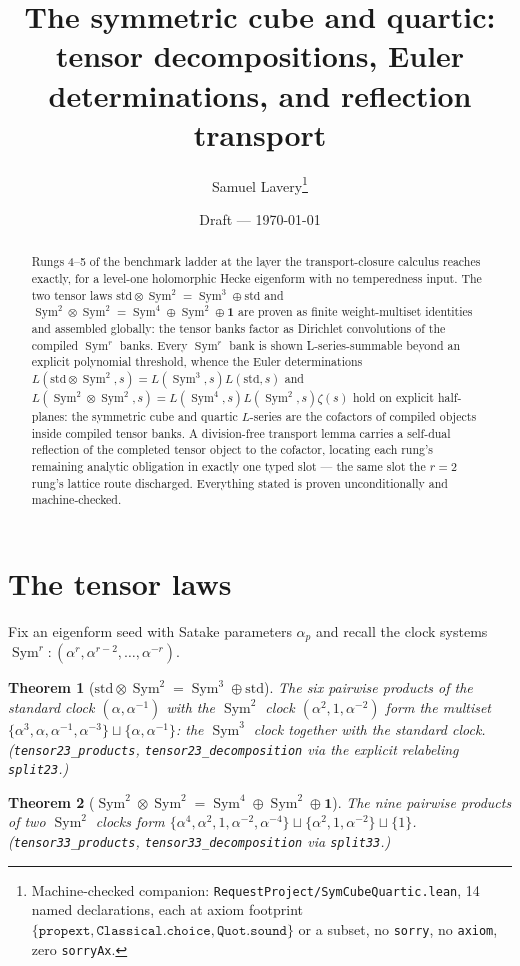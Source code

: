 \documentclass[11pt]{article}
\title{The symmetric cube and quartic:\\ tensor decompositions, Euler determinations,
and reflection transport}
\author{Samuel Lavery\thanks{Machine-checked companion:
\texttt{RequestProject/SymCubeQuartic.lean}, 14 named declarations, each at axiom
footprint $\{\texttt{propext},\texttt{Classical.choice},\texttt{Quot.sound}\}$ or a
subset, no \texttt{sorry}, no \texttt{axiom}, zero \texttt{sorryAx}.}}
\date{Draft --- \today}
\newtheorem{theorem}{Theorem}
\newcommand{\Sym}{\operatorname{Sym}}
\begin{document}
\maketitle

\begin{abstract}
Rungs 4--5 of the benchmark ladder at the layer the transport-closure calculus reaches
exactly, for a level-one holomorphic Hecke eigenform with no temperedness input.  The two
tensor laws $\mathrm{std}\otimes\Sym^2=\Sym^3\oplus\mathrm{std}$ and
$\Sym^2\otimes\Sym^2=\Sym^4\oplus\Sym^2\oplus\mathbf 1$ are proven as finite
weight-multiset identities and assembled globally: the tensor banks factor as Dirichlet
convolutions of the compiled $\Sym^r$ banks.  Every $\Sym^r$ bank is shown
L-series-summable beyond an explicit polynomial threshold, whence the Euler
determinations $L(\mathrm{std}\otimes\Sym^2,s)=L(\Sym^3,s)L(\mathrm{std},s)$ and
$L(\Sym^2\otimes\Sym^2,s)=L(\Sym^4,s)L(\Sym^2,s)\zeta(s)$ hold on explicit half-planes:
the symmetric cube and quartic $L$-series are the cofactors of compiled objects inside
compiled tensor banks.  A division-free transport lemma carries a self-dual reflection of
the completed tensor object to the cofactor, locating each rung's remaining analytic
obligation in exactly one typed slot --- the same slot the $r=2$ rung's lattice route
discharged.  Everything stated is proven unconditionally and machine-checked.
\end{abstract}

\section{The tensor laws}

Fix an eigenform seed with Satake parameters $\alpha_p$ and recall the clock systems
$\Sym^r\!: (\alpha^{r},\alpha^{r-2},\dots,\alpha^{-r})$.

\begin{theorem}[$\mathrm{std}\otimes\Sym^2=\Sym^3\oplus\mathrm{std}$]\label{thm:t23}
The six pairwise products of the standard clock $(\alpha,\alpha^{-1})$ with the $\Sym^2$
clock $(\alpha^2,1,\alpha^{-2})$ form the multiset
$\{\alpha^3,\alpha,\alpha^{-1},\alpha^{-3}\}\sqcup\{\alpha,\alpha^{-1}\}$: the $\Sym^3$
clock together with the standard clock.  (\texttt{tensor23\_products},
\texttt{tensor23\_decomposition} via the explicit relabeling \texttt{split23}.)
\end{theorem}

\begin{theorem}[$\Sym^2\otimes\Sym^2=\Sym^4\oplus\Sym^2\oplus\mathbf 1$]\label{thm:t33}
The nine pairwise products of two $\Sym^2$ clocks form
$\{\alpha^4,\alpha^2,1,\alpha^{-2},\alpha^{-4}\}\sqcup\{\alpha^2,1,\alpha^{-2}\}
\sqcup\{1\}$.  (\texttt{tensor33\_products}, \texttt{tensor33\_decomposition} via
\texttt{split33}.)
\end{theorem}
\end{document}

